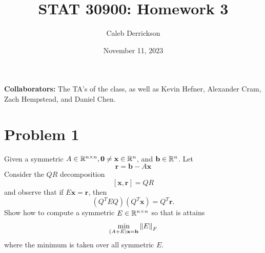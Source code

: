

\title{STAT 30900: Homework 3}
\author{Caleb Derrickson}
\date{November 11, 2023}


\onehalfspacing
\maketitle
\allowdisplaybreaks
{\color{cit}\vspace{2mm}\noindent\textbf{Collaborators:}} The TA's of the class, as well as Kevin Hefner, Alexander Cram, Zach Hempstead, and Daniel Chen.

\tableofcontents

\newpage
\section{Problem 1}
Given a symmetric $A \in \mathbb{R}^{n\times n}, \textbf{0} \neq \textbf{x} \in \mathbb{R}^n$, and $\textbf{b} \in \mathbb{R}^n$. Let 
\[
\textbf{r} = \textbf{b} - A\textbf{x}
\]
Consider the $QR$ decomposition
\[
[\textbf{x}, \textbf{r}] = QR
\]
and observe that if $E\textbf{x} = \textbf{r}$, then
\[
(Q^TEQ)(Q^T\textbf{x}) = Q^T\textbf{r}.
\]
Show how to compute a symmetric $E \in \mathbb{R}^{n\times n}$ so that is attains 
\[
\min_{(A+E)\textbf{x} = \textbf{b}}\norm{E}_F
\]
where the minimum is taken over all symmetric $E$.
\partbreak
